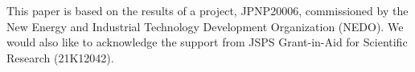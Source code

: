 \documentclass[sigconf]{acmart}
\begin{document}
\begin{acks}
This paper is based on the results of a project, JPNP20006, commissioned by the New Energy and Industrial Technology Development Organization (NEDO). We would also like to acknowledge the support from JSPS Grant-in-Aid for Scientific Research (21K12042).
\end{acks}
\end{document}
